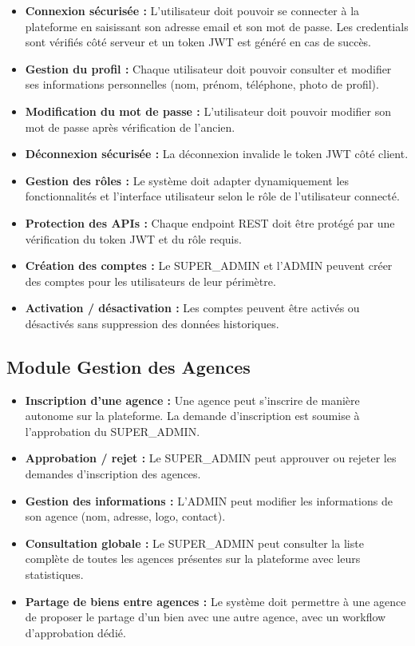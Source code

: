 \documentclass[a4paper,12pt]{report}
\begin{document}
\begin{itemize}
    \item \textbf{Connexion sécurisée :} L'utilisateur doit pouvoir se connecter à la plateforme en saisissant son adresse email et son mot de passe. Les credentials sont vérifiés côté serveur et un token JWT est généré en cas de succès.
    \item \textbf{Gestion du profil :} Chaque utilisateur doit pouvoir consulter et modifier ses informations personnelles (nom, prénom, téléphone, photo de profil).
    \item \textbf{Modification du mot de passe :} L'utilisateur doit pouvoir modifier son mot de passe après vérification de l'ancien.
    \item \textbf{Déconnexion sécurisée :} La déconnexion invalide le token JWT côté client.
    \item \textbf{Gestion des rôles :} Le système doit adapter dynamiquement les fonctionnalités et l'interface utilisateur selon le rôle de l'utilisateur connecté.
    \item \textbf{Protection des APIs :} Chaque endpoint REST doit être protégé par une vérification du token JWT et du rôle requis.
    \item \textbf{Création des comptes :} Le SUPER\_ADMIN et l'ADMIN peuvent créer des comptes pour les utilisateurs de leur périmètre.
    \item \textbf{Activation / désactivation :} Les comptes peuvent être activés ou désactivés sans suppression des données historiques.
\end{itemize}

\subsection{Module Gestion des Agences}

\begin{itemize}
    \item \textbf{Inscription d'une agence :} Une agence peut s'inscrire de manière autonome sur la plateforme. La demande d'inscription est soumise à l'approbation du SUPER\_ADMIN.
    \item \textbf{Approbation / rejet :} Le SUPER\_ADMIN peut approuver ou rejeter les demandes d'inscription des agences.
    \item \textbf{Gestion des informations :} L'ADMIN peut modifier les informations de son agence (nom, adresse, logo, contact).
    \item \textbf{Consultation globale :} Le SUPER\_ADMIN peut consulter la liste complète de toutes les agences présentes sur la plateforme avec leurs statistiques.
    \item \textbf{Partage de biens entre agences :} Le système doit permettre à une agence de proposer le partage d'un bien avec une autre agence, avec un workflow d'approbation dédié.
\end{itemize}
\end{document}
